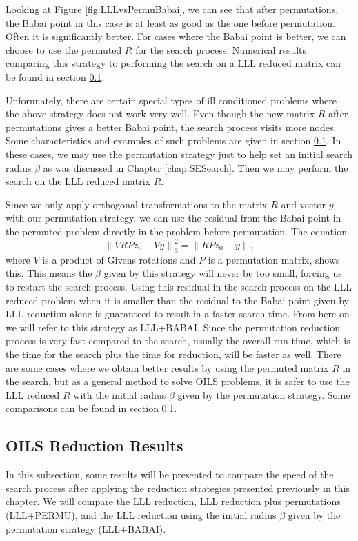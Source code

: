 \documentclass[12pt,Bold,letterpaper]{mcgilletdclass}
\newcommand{\vsp}{\vspace{\baselineskip}}
\begin{document}
Looking at Figure \ref{fig:LLLvsPermuBabai}, we can see that after permutations, the Babai point in this case is at least as good as the one before permutation. Often it is significantly better. For cases where the Babai point is better, we can choose to use the permuted $R$ for the search process. Numerical results comparing this strategy to performing the search on a LLL reduced matrix can be found in section \ref{sec:ILSReductionResults}.

Unforunately, there are certain special types of ill conditioned problems where the above strategy does not work very well. Even though the new matrix $R$ after permutations gives a better Babai point, the search process visits more nodes. Some characteristics and examples of such problems are given in section \ref{sec:ILSReductionResults}. In these cases, we may use the permutation strategy just to help set an initial search radius $\beta$ as was discussed in Chapter \ref{chap:SESearch}. Then we may perform the search on the LLL reduced matrix $R$.

Since we only apply orthogonal transformations to the matrix $R$ and vector $y$ with our permutation strategy, we can use the residual from the Babai point in the permuted problem directly in the problem before permutation. The equation $$\left \| VRPz_0 - Vy \right \|_2^2 = \left \| RPz_0 - y \right \|,$$ where $V$ is a product of Givens rotations and $P$ is a permutation matrix, shows this. This means the $\beta$ given by this strategy will never be too small, forcing us to restart the search process. Using this residual in the search process on the LLL reduced problem when it is smaller than the residual to the Babai point given by LLL reduction alone is guaranteed to result in a faster search time. From here on we will refer to this strategy as LLL+BABAI. Since the permutation reduction process is very fast compared to the search, usually the overall run time, which is the time for the search plus the time for reduction, will be faster as well. There are some cases where we obtain better results by using the permuted matrix $R$ in the search, but as a general method to solve OILS problems, it is safer to use the LLL reduced $R$ with the initial radius $\beta$ given by the permutation strategy. Some comparisons can be found in section \ref{sec:ILSReductionResults}.

\vsp \subsection{OILS Reduction Results} \label{sec:ILSReductionResults}
In this subsection, some results will be presented to compare the speed of the search process after applying the reduction strategies presented previously in this chapter. We will compare the LLL reduction, LLL reduction plus permutations (LLL+PERMU), and the LLL reduction using the initial radius $\beta$ given by the permutation strategy (LLL+BABAI).
\end{document}
